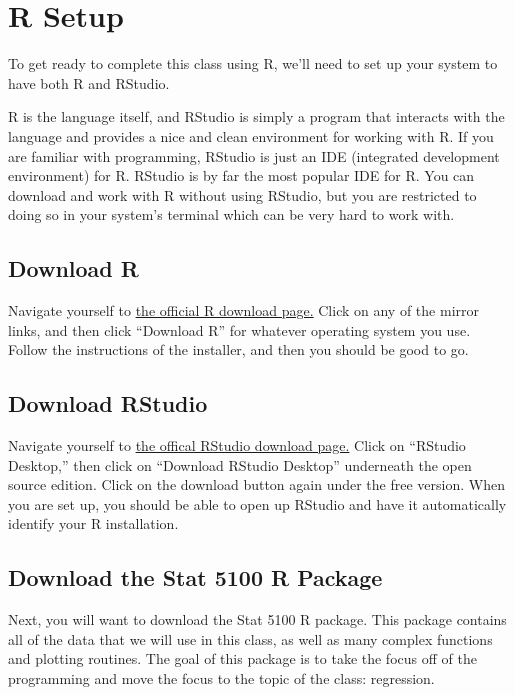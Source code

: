 \documentclass{article}\usepackage[]{graphicx}\usepackage[]{color}
\begin{document}
\section{R Setup}

To get ready to complete this class using R, we'll need to set up your system to have both R and RStudio.

R is the language itself, and RStudio is simply a program that interacts with the language and provides a nice and clean environment for working with R. If you are familiar with programming, RStudio is just an IDE (integrated development environment) for R. RStudio is by far the most popular IDE for R. You can download and work with R without using RStudio, but you are restricted to doing so in your system's terminal which can be very hard to work with.

\subsection{Download R}

Navigate yourself to \href{https://cran.r-project.org/mirrors.html}{the official R download page.} Click on any of the mirror links, and then click ``Download R'' for whatever operating system you use. Follow the instructions of the installer, and then you should be good to go.

\subsection{Download RStudio}

Navigate yourself to \href{https://rstudio.com/products/rstudio/}{the offical RStudio download page.} Click on ``RStudio Desktop,'' then click on ``Download RStudio Desktop'' underneath the open source edition. Click on the download button again under the free version. When you are set up, you should be able to open up RStudio and have it automatically identify your R installation.

\subsection{Download the Stat 5100 R Package}

Next, you will want to download the Stat 5100 R package. This package contains all of the data that we will use in this class, as well as many complex functions and plotting routines. The goal of this package is to take the focus off of the programming and move the focus to the topic of the class: regression.
\end{document}
